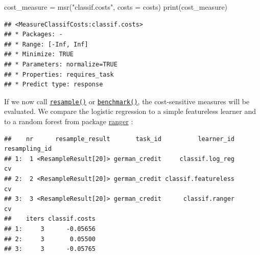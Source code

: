 \documentclass[
]{scrbook}
\newenvironment{Shaded}{\begin{snugshade}}{\end{snugshade}}
\newcommand{\AttributeTok}[1]{\textcolor[rgb]{0.77,0.63,0.00}{#1}}
\newcommand{\DecValTok}[1]{\textcolor[rgb]{0.00,0.00,0.81}{#1}}
\newcommand{\FunctionTok}[1]{\textcolor[rgb]{0.00,0.00,0.00}{#1}}
\newcommand{\NormalTok}[1]{#1}
\newcommand{\OtherTok}[1]{\textcolor[rgb]{0.56,0.35,0.01}{#1}}
\newcommand{\SpecialCharTok}[1]{\textcolor[rgb]{0.00,0.00,0.00}{#1}}
\newcommand{\StringTok}[1]{\textcolor[rgb]{0.31,0.60,0.02}{#1}}
\renewenvironment{Shaded} {\begin{snugshade}\small} {\end{snugshade}}
\begin{document}
\begin{Shaded}
\begin{Highlighting}[]
\NormalTok{cost\_measure }\OtherTok{=} \FunctionTok{msr}\NormalTok{(}\StringTok{"classif.costs"}\NormalTok{, }\AttributeTok{costs =}\NormalTok{ costs)}
\FunctionTok{print}\NormalTok{(cost\_measure)}
\end{Highlighting}
\end{Shaded}

\begin{verbatim}
## <MeasureClassifCosts:classif.costs>
## * Packages: -
## * Range: [-Inf, Inf]
## * Minimize: TRUE
## * Parameters: normalize=TRUE
## * Properties: requires_task
## * Predict type: response
\end{verbatim}

If we now call \href{https://mlr3.mlr-org.com/reference/resample.html}{\texttt{resample()}} or \href{https://mlr3.mlr-org.com/reference/benchmark.html}{\texttt{benchmark()}}, the cost-sensitive measures will be evaluated.
We compare the logistic regression to a simple featureless learner and to a random forest from package \href{https://cran.r-project.org/package=ranger}{ranger} :

\begin{Shaded}
\end{Shaded}

\begin{verbatim}
##    nr      resample_result       task_id          learner_id resampling_id
## 1:  1 <ResampleResult[20]> german_credit     classif.log_reg            cv
## 2:  2 <ResampleResult[20]> german_credit classif.featureless            cv
## 3:  3 <ResampleResult[20]> german_credit      classif.ranger            cv
##    iters classif.costs
## 1:     3      -0.05656
## 2:     3       0.05500
## 3:     3      -0.05765
\end{verbatim}
\end{document}
